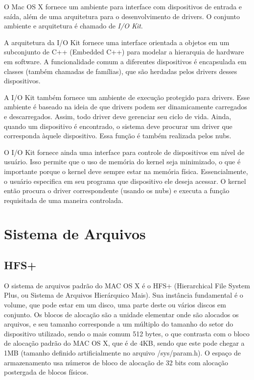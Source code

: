 \documentclass[12pt]{article}
\begin{document}
O Mac OS X fornece um ambiente para interface com dispositivos de entrada e saída, além de uma arquitetura para o desenvolvimento de drivers. O conjunto ambiente e arquitetura é chamado de \textit{I/O Kit}. 

A arquitetura da I/O Kit fornece uma interface orientada a objetos em um subconjunto de C++ (Embedded C++) para modelar a hierarquia de hardware em software. A funcionalidade comum a diferentes dispositivos é encapsulada em classes (também chamadas de famílias), que são herdadas pelos drivers desses dispositivos.

A I/O Kit também fornece um ambiente de execução protegido para drivers. Esse ambiente é baseado na ideia de que drivers podem ser dinamicamente carregados e descarregados. Assim, todo driver deve gerenciar seu ciclo de vida. Ainda, quando um dispositivo é encontrado, o sistema deve procurar um driver que corresponda àquele dispositivo. Essa função é também realizada pelos nubs. 

O I/O Kit fornece ainda uma interface para controle de dispositivos em nível de usuário. Isso permite que o uso de memória do kernel seja minimizado, o que é importante porque o kernel deve sempre estar na memória física. Essencialmente, o usuário especifica em seu programa que dispositivo ele deseja acessar. O kernel então procura o driver correspondente (usando os nubs) e executa a função requisitada de uma maneira controlada. 


\section{Sistema de Arquivos}
\subsection{HFS+}
O sistema de arquivos padrão do MAC OS X é o HFS+ (Hierarchical File System Plus, ou Sistema de Arquivos Hierárquico Mais). Sua instância fundamental é o volume, que pode estar em um disco, uma parte deste ou vários discos em conjunto. Os blocos de alocação são a unidade elementar onde são alocados os arquivos, e seu tamanho corresponde a um múltiplo do tamanho do setor do dispositivo utilizado, sendo o mais comum 512 bytes, o que contrasta com o bloco de alocação padrão do MAC OS X, que é de 4KB, sendo que este pode chegar a 1MB (tamanho definido artificialmente no arquivo /sys/param.h). O espaço de armazenamento usa números de bloco de alocação de 32 bits com alocação postergada de blocos físicos.
\end{document}
